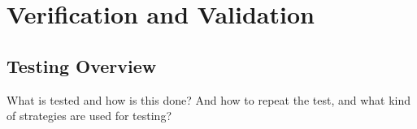 \chapter{Verification and Validation}
\label{chapter:vv}

\section {Testing Overview}
What is tested and how is this done? And how to repeat the test, and what kind of strategies are used for testing?